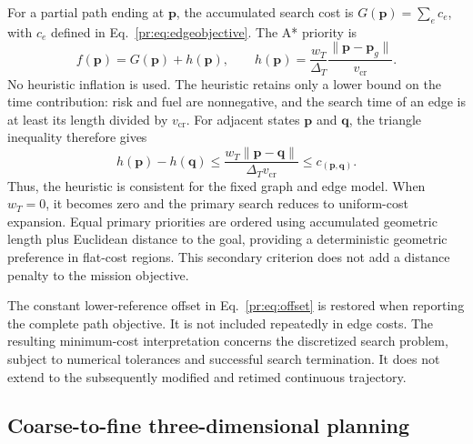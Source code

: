 \documentclass[preprint,12pt]{elsarticle}
\begin{document}
For a partial path ending at $\mathbf p$, the accumulated search cost is
$G(\mathbf p)=\sum_e c_e$, with $c_e$ defined in
Eq.~\eqref{pr:eq:edgeobjective}. The A* priority is
\begin{equation}
 f(\mathbf p)=G(\mathbf p)+h(\mathbf p),\qquad
 h(\mathbf p)=\frac{w_T}{\Delta_T}
              \frac{\|\mathbf p-\mathbf p_g\|}{v_{\mathrm{cr}}}.
 \label{me:eq:heuristic}
\end{equation}
No heuristic inflation is used. The heuristic retains only a lower bound
on the time contribution: risk and fuel are nonnegative, and the search
time of an edge is at least its length divided by $v_{\mathrm{cr}}$.
For adjacent states $\mathbf p$ and $\mathbf q$, the triangle inequality
therefore gives
\begin{equation}
 h(\mathbf p)-h(\mathbf q)
 \le \frac{w_T\|\mathbf p-\mathbf q\|}{\Delta_Tv_{\mathrm{cr}}}
 \le c_{(\mathbf p,\mathbf q)}.
 \label{me:eq:consistency}
\end{equation}
Thus, the heuristic is consistent for the fixed graph and edge model.
When $w_T=0$, it becomes zero and the primary search reduces to uniform-cost
expansion. Equal primary priorities are ordered using accumulated geometric
length plus Euclidean distance to the goal, providing a deterministic
geometric preference in flat-cost regions. This secondary criterion does
not add a distance penalty to the mission objective.

The constant lower-reference offset in Eq.~\eqref{pr:eq:offset} is restored
when reporting the complete path objective. It is not included repeatedly
in edge costs. The resulting minimum-cost interpretation concerns the
discretized search problem, subject to numerical tolerances and successful
search termination. It does not extend to the subsequently modified and
retimed continuous trajectory.

\subsection{Coarse-to-fine three-dimensional planning}
\label{sec:coarsefine}
\end{document}
